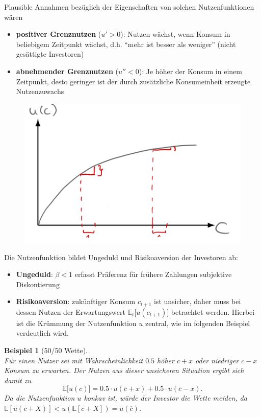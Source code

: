 \documentclass[12pt]{extreport} %
\theoremstyle{named}
\theoremstyle{nnamed}
\theoremstyle{itshape}
\theoremstyle{normal}
\newtheorem*{beispiel}{Beispiel}
\begin{document}
\newpage

Plausible Annahmen bezüglich der Eigenschaften von solchen Nutzenfunktionen wären
\begin{itemize}
	\item \textbf{positiver Grenznutzen} ($u' > 0$): Nutzen wächst, wenn Konsum in beliebigem Zeitpunkt wächst, d.h. \enquote{mehr ist besser als weniger} (nicht gesättigte Investoren)
	\item \textbf{abnehmender Grenznutzen} ($u'' < 0$): Je höher der Konsum in einem Zeitpunkt, desto geringer ist der durch zusätzliche Konsumeinheit erzeugte Nutzenzuwachs
\end{itemize} 

\begin{figure}[h!] \centering
	\includegraphics[scale=0.2725]{img/p17}
\end{figure}

Die Nutzenfunktion bildet Ungeduld und Risikoaversion der Investoren ab:

\begin{itemize}
	\item \textbf{Ungeduld}: $\beta < 1$ erfasst Präferenz für frühere Zahlungen subjektive Diskontierung
	\item \textbf{Risikoaversion}: zukünftiger Konsum $c_{t+1}$ ist unsicher, daher muss bei dessen Nutzen der Erwartungswert $\mathbb{E}_t \big[ u(c_{t+1}) \big]$ betrachtet werden. Hierbei ist die Krümmung der Nutzenfunktion $u$ zentral, wie im folgenden Beispiel verdeutlich wird.
\end{itemize} 

\begin{beispiel}[50/50 Wette] ~\\
	Für einen Nutzer sei mit Wahrscheinlichkeit $0.5$ höher $\overline{c} + x$ oder niedriger $\overline{c} - x$ Konsum zu erwarten. Der Nutzen aus dieser unsicheren Situation ergibt sich damit zu
		$$ \mathbb{E} \big[ u(c) \big] = 0.5 \cdot u ( \overline{c} + x ) + 0.5 \cdot u ( \overline{c} - x ). $$
	Da die Nutzenfunktion $u$ konkav ist, würde der Investor die Wette meiden, da $\mathbb{E}\left[ u\left(c + X\right) \right] < u\left(\mathbb{E}\left[c+ X\right]\right)  = u \left( \overline{c} \right)$.
\end{beispiel} 
\end{document}
